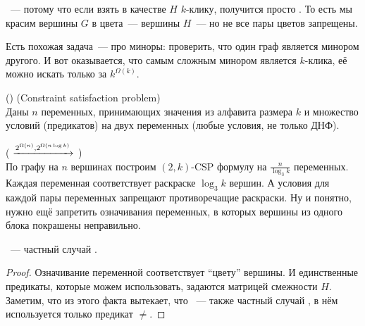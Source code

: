 \begin{remark}
~--- потому что если взять в качестве $H$ $k$-клику, получится просто . То есть мы красим вершины $G$ в цвета~--- вершины $H$~--- но не все пары цветов запрещены.
\end{remark}

\begin{remark}
Есть похожая задача~--- про миноры: проверить, что один граф является минором другого. И вот оказывается, что самым сложным минором является $k$-клика, её можно искать только за $k^{\Omega(k)}$.
\end{remark}

\begin{problem}() (Constraint satisfaction problem) \\
    Даны $n$ переменных, принимающих значения из алфавита размера $k$ и множество условий (предикатов) на двух переменных (любые условия, не только ДНФ).
\end{problem}

\begin{reduction}( $\xrightarrow{2^{\Omega(n)}, 2^{\Omega(n \log k)}}$ )\\
    По графу на $n$ вершинах построим $(2, k)$-CSP формулу на $\frac{n}{\log_3 k}$ переменных.\\
    Каждая переменная соответствует раскраске $\log_3 k$ вершин. А условия для каждой пары переменных запрещают противоречащие раскраски. Ну и понятно, нужно ещё запретить означивания переменных, в которых вершины из одного блока покрашены неправильно. 
\end{reduction}

\begin{statement}
~--- частный случай .
\end{statement}

\begin{proof}
Означивание переменной соответствует ``цвету'' вершины. И единственные предикаты, которые можем использовать, задаются матрицей смежности $H$.\\
Заметим, что из этого факта вытекает, что ~--- также частный случай , в нём используется только предикат $\neq$.
\end{proof}


